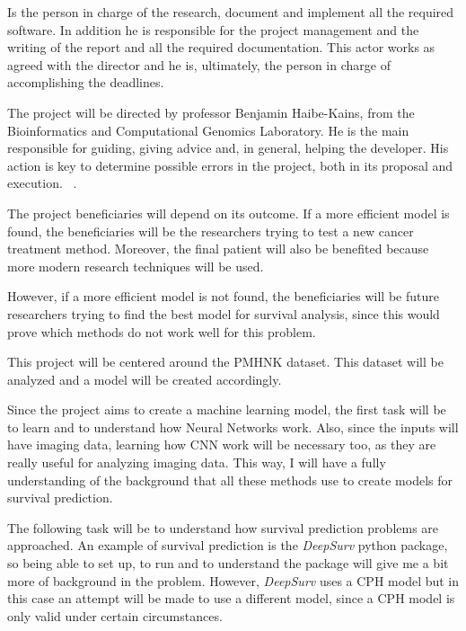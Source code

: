
Is the person in charge of the research, document and implement all the required software.
In addition he is responsible for the project management and the writing of the report
and all the required documentation. This actor works as agreed with the director and
he is, ultimately, the person in charge of accomplishing the deadlines.

The project will be directed by professor Benjamin Haibe-Kains, from the Bioinformatics 
and Computational Genomics Laboratory. He is the main responsible for guiding, giving 
advice and, in general, helping the developer.
His action is key to determine possible errors in the project, both in its proposal and 
execution.
~\cites{bhklab}.

The project beneficiaries will depend on its outcome. If a more efficient model is found, the
beneficiaries will be the researchers trying to test a new cancer treatment method. Moreover,
the final patient will also be benefited because more modern research techniques will be used.

However, if a more efficient model is not found, the beneficiaries will be future researchers
trying to find the best model for survival analysis, since this would prove which 
methods do not work well for this problem.


This project will be centered around the \gls{PMHNK} dataset. This dataset will be analyzed
and a model will be created accordingly.

Since the project aims to create a machine learning model, the first task will be to learn and 
to understand how Neural Networks work. Also, since the inputs will have imaging data, learning
how \gls{CNN} work will be necessary too, as they are really useful for analyzing imaging data. 
This way, I will have a fully understanding of the 
background that all these methods use to create models for survival prediction.

The following task will be to understand how survival prediction problems are approached. An
example of survival prediction is the \emph{DeepSurv} python package, so being able to set 
up, to run and to understand the package will give me a bit more of background in the problem.
However, \emph{DeepSurv} uses a \gls{CPH} model but in this case an attempt will be made to use
a different model, since a \gls{CPH} model is only valid under certain circumstances.
~\cites{medical:deep-surv-github}{medical:cox}

